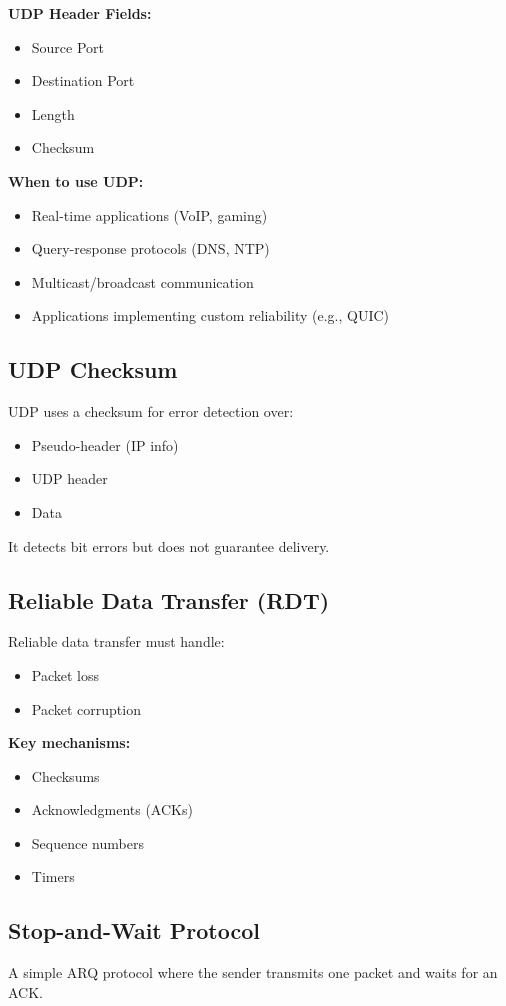 \textbf{UDP Header Fields:}
\begin{itemize}
    \item Source Port
    \item Destination Port
    \item Length
    \item Checksum
\end{itemize}

\textbf{When to use UDP:}
\begin{itemize}
    \item Real-time applications (VoIP, gaming)
    \item Query-response protocols (DNS, NTP)
    \item Multicast/broadcast communication
    \item Applications implementing custom reliability (e.g., QUIC)
\end{itemize}

\subsection{UDP Checksum}
UDP uses a checksum for error detection over:
\begin{itemize}
    \item Pseudo-header (IP info)
    \item UDP header
    \item Data
\end{itemize}
It detects bit errors but does not guarantee delivery.

\subsection{Reliable Data Transfer (RDT)}
Reliable data transfer must handle:
\begin{itemize}
    \item Packet loss
    \item Packet corruption
\end{itemize}

\textbf{Key mechanisms:}
\begin{itemize}
    \item Checksums
    \item Acknowledgments (ACKs)
    \item Sequence numbers
    \item Timers
\end{itemize}

\subsection{Stop-and-Wait Protocol}
A simple ARQ protocol where the sender transmits one packet and waits for an ACK.

